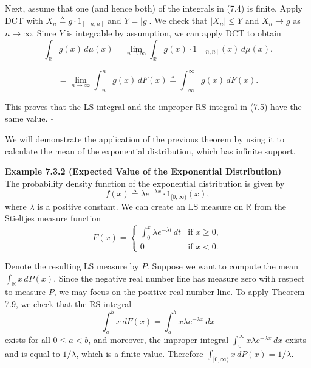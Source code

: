 Next, assume that one (and hence both) of the integrals in (7.4) is finite. Apply DCT with $X_n \triangleq g\cdot 1_{[-n,n]}$ and $Y=|g|$. We check that $|X_n|\le Y$ and $X_n\to g$ as $n\to\infty$. Since $Y$ is integrable by assumption, we can apply DCT to obtain
\[
\int_{\mathbb{R}} g(x)\, d\mu(x)
=
\lim_{n\to\infty} \int_{\mathbb{R}} g(x)\cdot 1_{[-n,n]}(x)\, d\mu(x).
\]

\[
= \lim_{n\to\infty} \int_{-n}^{n} g(x)\, dF(x)
\triangleq \int_{-\infty}^{\infty} g(x)\, dF(x).
\]

This proves that the LS integral and the improper RS integral in (7.5) have the same value. \hfill $\square$

We will demonstrate the application of the previous theorem by using it to calculate the mean of the exponential distribution, which has infinite support.

\textbf{Example 7.3.2 (Expected Value of the Exponential Distribution)} \\
The probability density function of the exponential distribution is given by
\[
f(x)\triangleq \lambda e^{-\lambda x}\cdot 1_{[0,\infty)}(x),
\]
where $\lambda$ is a positive constant. We can create an LS measure on $\mathbb{R}$ from the Stieltjes measure function
\[
F(x)=
\begin{cases}
\int_{0}^{x} \lambda e^{-\lambda t}\, dt & \text{if } x\ge 0,\\
0 & \text{if } x<0.
\end{cases}
\]

Denote the resulting LS measure by $P$. Suppose we want to compute the mean $\int_{\mathbb{R}} x\, dP(x)$. Since the negative real number line has measure zero with respect to measure $P$, we may focus on the positive real number line. To apply Theorem 7.9, we check that the RS integral
\[
\int_{a}^{b} x\, dF(x)=\int_{a}^{b} x\lambda e^{-\lambda x}\, dx
\]
exists for all $0\le a<b$, and moreover, the improper integral $\int_{0}^{\infty} x\lambda e^{-\lambda x}\, dx$ exists and is equal to $1/\lambda$, which is a finite value. Therefore $\int_{[0,\infty)} x\, dP(x)=1/\lambda$.
